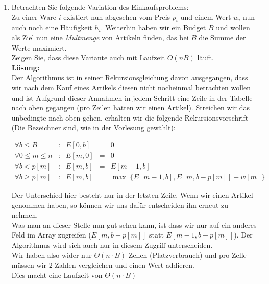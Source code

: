 \documentclass[11pt,a4paper,ngerman]{article}
\begin{document}
\begin{enumerate}[\bfseries (a)]



\item Betrachten Sie folgende Variation des Einkaufsproblems:\\
Zu einer Ware $i$ existiert nun abgesehen vom Preis $p_i$ und einem Wert $w_i$ nun auch noch eine Häufigkeit $h_i$. Weiterhin haben wir ein Budget $B$ und wollen als Ziel nun eine \emph{Multmenge} von Artikeln finden, das bei $B$ die Summe der Werte maximiert.\\
Zeigen Sie, dass diese Variante auch mit Laufzeit $O(nB)$ läuft.\\

\textbf{Lösung:}\\

Der Algorithmus ist in seiner Rekursionsgleichung davon ausgegangen, dass wir nach dem Kauf eines Artikels diesen nicht nocheinmal betrachten wollen und ist Aufgrund dieser Annahmen in jedem Schritt eine Zeile in der Tabelle nach oben gegangen (pro Zeilen hatten wir einen Artikel). Streichen wir das unbedingte nach oben gehen, erhalten wir die folgende Rekursionsvorschrift (Die Bezeichner sind, wie in der Vorlesung gewählt):

$$
\begin{array}{lcrcl}
\forall b \leq B & : & E[0,b] &=& 0\\
\forall 0 \leq m \leq n &:& E[m,0] &=& 0\\
\forall b < p[m] & : & E[m,b] &=& E[m-1,b]\\
\forall b \geq p[m] &:& E[m,b] &=& \max \; \{ E[m-1,b] , E[m, b - p[m]] + w[m] \}
\end{array}
$$

Der Unterschied hier besteht nur in der letzten Zeile. Wenn wir einen Artikel genommen haben, so können wir uns dafür entscheiden ihn erneut zu nehmen.\\

Was man an dieser Stelle nun gut sehen kann, ist dass wir nur auf ein anderes Feld im Array zugreifen ($E[m, b- p[m]]$ statt $E[m - 1, b - p[m]]$). Der Algorithmus wird sich auch nur in diesem Zugriff unterscheiden.\\

Wir haben also wider nur $\Theta ( n \cdot B)$ Zellen (Platzverbrauch) und pro Zelle müssen wir 2 Zahlen vergleichen und einen Wert addieren.\\
Dies macht eine Laufzeit von $\Theta ( n \cdot B )$


\end{enumerate}
\end{document}
